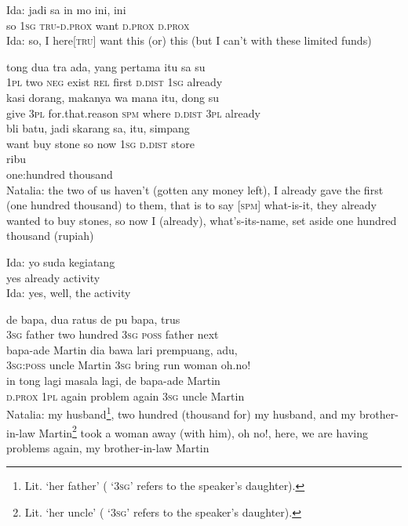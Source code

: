 \ea
\gll   Ida:   jadi   sa   in   mo   ini,   ini\\
{}   so   \textsc{1sg}   \textsc{tru-d.prox}   want   \textsc{d.prox}   \textsc{d.prox}\\
\glt
Ida: so, I here[\textsc{tru}] want this (or) this (but I can’t with these limited funds)
\z

\ea
{}    {tong}    {dua}    {tra}    {ada,}    {yang}    {pertama}    {itu}    {sa}   su\\
   {}    {\textsc{1pl}}    {two}    {\textsc{neg}}    {exist}    {\textsc{rel}}    {first}    {\textsc{d.dist}}    {\textsc{1sg}}   already\\
\gll  kasi    {dorang,}    {makanya}    {wa}    {mana}    {itu,}    {dong}    {su}\\
  give    {\textsc{3pl}}    {for.that.reason}    {\textsc{spm}}    {where}    {\textsc{d.dist}}    {\textsc{3pl}}    {already}\\
    {bli}    {batu,}    {jadi}    {skarang}    {sa,}    {itu,}    {simpang}\\
   {want}    {buy}    {stone}    {so}    {now}    {\textsc{1sg}}    {\textsc{d.dist}}    {store}\\
    {ribu}\\
   {one:hundred}    {thousand}\\
\glt
Natalia: the two of us haven’t (gotten any money left), I already gave the first (one hundred thousand) to them, that is to say [\textsc{spm}] what-is-it, they already wanted to buy stones, so now I (already), what’s-its-name, set aside one hundred thousand (rupiah)
\z

\ea
\gll   Ida:   yo   suda   kegiatang\\
  {}   yes   already   activity\\
\glt
Ida: yes, well, the activity
\z

\ea
{}    {de}    {bapa,}    {dua}    {ratus}    {de}    {pu}   bapa,    {trus}\\
   {}    {\textsc{3sg}}    {father}    {two}    {hundred}    {\textsc{3sg}}    {\textsc{poss}}   father    {next}\\
    {bapa-ade}    {Martin}    {dia}    {bawa}    {lari}    {prempuang,}   adu,\\
   {\textsc{3sg}:\textsc{poss}}    {uncle}    {Martin}    {\textsc{3sg}}    {bring}    {run}    {woman}   oh.no!\\
\gll  in    {tong}    {lagi}    {masala}    {lagi,}    {de}    {bapa-ade}    {Martin}\\
  \textsc{d.prox}    {\textsc{1pl}}    {again}    {problem}    {again}    {\textsc{3sg}}    {uncle}    {Martin}\\
\glt
Natalia: my husband\footnote{Lit. ‘her father’ ( ‘\textsc{3sg}’ refers to the speaker’s daughter).}, two hundred (thousand for) my husband, and my brother-in-law Martin\footnote{Lit. ‘her uncle’ ( ‘\textsc{3sg}’ refers to the speaker’s daughter).} took a woman away (with him), oh no!, here, we are having problems again, my brother-in-law Martin
\z

